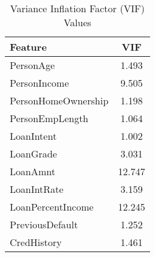 \begin{table}[H]\centering
\caption{Variance Inflation Factor (VIF) Values}
\label{Table 4:vif_values}
\begin{tabular}{lc}
\toprule
Feature & VIF \\
\midrule
PersonAge & 1.493 \\
PersonIncome & 9.505 \\
PersonHomeOwnership & 1.198 \\
PersonEmpLength & 1.064 \\
LoanIntent & 1.002 \\
LoanGrade & 3.031 \\
LoanAmnt & 12.747 \\
LoanIntRate & 3.159 \\
LoanPercentIncome & 12.245 \\
PreviousDefault & 1.252 \\
CredHistory & 1.461 \\
\bottomrule
\end{tabular}
\end{table}
